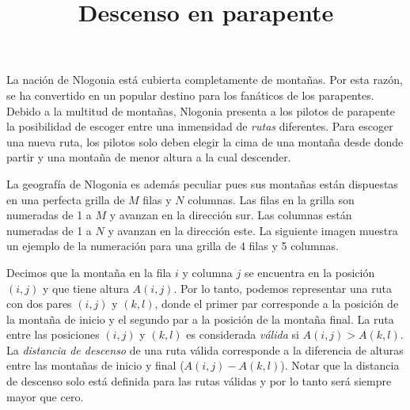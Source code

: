 \documentclass{oci}
\title{Descenso en parapente}
\begin{document}
\begin{problemDescription}

La nación de Nlogonia está cubierta completamente de montañas.
Por esta razón, se ha convertido en un popular destino para los fanáticos de los parapentes.
Debido a la multitud de montañas, Nlogonia presenta a los pilotos de parapente la posibilidad de
escoger entre una inmensidad de \emph{rutas} diferentes.
Para escoger una nueva ruta, los pilotos solo deben elegir la cima de una montaña desde donde
partir y una montaña de menor altura a la cual descender.

La geografía de Nlogonia es además peculiar pues sus montañas están dispuestas en una perfecta
grilla de $M$ filas y $N$ columnas.
Las filas en la grilla son numeradas de 1 a $M$ y avanzan en la dirección sur.
Las columnas están numeradas de 1 a $N$ y avanzan en la dirección este.
La siguiente imagen muestra un ejemplo de la numeración para una grilla de 4 filas y 5 columnas.
\begin{center}
\end{center}

Decimos que la montaña en la fila $i$ y columna $j$ se encuentra en la posición $(i,j)$ y que
tiene altura $A(i,j)$.
Por lo tanto, podemos representar una ruta con dos pares $(i, j)$ y $(k,l)$, donde el primer par
corresponde a la posición de la montaña de inicio y el segundo par a la posición de la montaña
final.
La ruta entre las posiciones $(i, j)$ y $(k, l)$ es considerada \emph{válida} si $A(i, j) > A(k, l)$.
La \emph{distancia de descenso} de una ruta válida corresponde a la diferencia de alturas entre
las montañas de inicio y final ($A(i, j) - A(k, l)$).
Notar que la distancia de descenso solo está definida para las rutas válidas y por lo tanto será
siempre mayor que cero.


\end{problemDescription}
\end{document}
